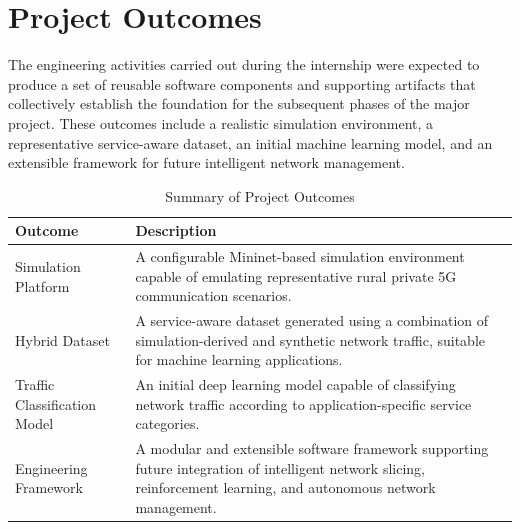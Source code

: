 \documentclass[12pt,a4paper]{report}
\begin{document}
	\section{Project Outcomes}
	\label{sec:expected_outcomes}
	
	The engineering activities carried out during the internship were expected to produce a set of reusable software components and supporting artifacts that collectively establish the foundation for the subsequent phases of the major project. These outcomes include a realistic simulation environment, a representative service-aware dataset, an initial machine learning model, and an extensible framework for future intelligent network management.
	
	\begin{table}[H]
		\centering
		\caption{Summary of Project Outcomes}
		\label{tab:expected_outcomes}
		
		\begin{tabular}{|p{4.5cm}|p{8.5cm}|}
			\hline
			
			\textbf{Outcome} &
			\textbf{Description}
			\\
			\hline
			
			Simulation Platform &
			A configurable Mininet-based simulation environment capable of emulating representative rural private 5G communication scenarios.
			\\
			\hline
			
			Hybrid Dataset &
			A service-aware dataset generated using a combination of simulation-derived and synthetic network traffic, suitable for machine learning applications.
			\\
			\hline
			
			Traffic Classification Model &
			An initial deep learning model capable of classifying network traffic according to application-specific service categories.
			\\
			\hline
			
			Engineering Framework &
			A modular and extensible software framework supporting future integration of intelligent network slicing, reinforcement learning, and autonomous network management.
			\\
			\hline
			
		\end{tabular}
		
	\end{table}
	
\end{document}
